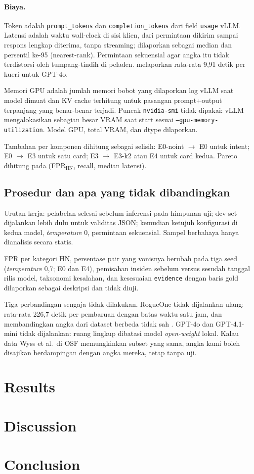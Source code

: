 \documentclass[a4paper,fleqn]{cas-dc}
\begin{document}
\paragraph{Biaya.}
Token adalah \texttt{prompt\_tokens} dan \texttt{completion\_tokens} dari
field \texttt{usage} vLLM. Latensi adalah waktu wall-clock di sisi klien,
dari permintaan dikirim sampai respons lengkap diterima, tanpa streaming;
dilaporkan sebagai median dan persentil ke-95 (nearest-rank). Permintaan
sekuensial agar angka itu tidak terdistorsi oleh tumpang-tindih di peladen.
\citet{wyss2025evaluating} melaporkan rata-rata 9,91 detik per kueri untuk
GPT-4o.

Memori GPU adalah jumlah memori bobot yang dilaporkan log vLLM saat model
dimuat dan KV cache terhitung untuk pasangan prompt+output terpanjang yang
benar-benar terjadi. Puncak \texttt{nvidia-smi} tidak dipakai: vLLM
mengalokasikan sebagian besar VRAM saat start sesuai
\texttt{--gpu-memory-utilization}. Model GPU, total VRAM, dan dtype
dilaporkan.

Tambahan per komponen dihitung sebagai selisih: E0-noint $\rightarrow$ E0
untuk intent; E0 $\rightarrow$ E3 untuk satu card; E3 $\rightarrow$ E3-k2
atau E4 untuk card kedua. Pareto dihitung pada
(FPR$_{\mathrm{HN}}$, recall, median latensi).

\subsection{Prosedur dan apa yang tidak dibandingkan}

Urutan kerja: pelabelan selesai sebelum inferensi pada himpunan uji; dev set
dijalankan lebih dulu untuk validitas JSON; kemudian ketujuh konfigurasi di
kedua model, \emph{temperature} 0, permintaan sekuensial. Sampel berbahaya
hanya dianalisis secara statis.

FPR per kategori HN, persentase pair yang vonisnya berubah pada tiga seed
(\emph{temperature} 0,7; E0 dan E4), pemisahan insiden sebelum versus sesudah
tanggal rilis model, taksonomi kesalahan, dan kesesuaian \texttt{evidence}
dengan baris gold dilaporkan sebagai deskripsi dan tidak diuji.

Tiga perbandingan sengaja tidak dilakukan. RogueOne tidak dijalankan ulang:
rata-rata 226,7 detik per pembaruan dengan batas waktu satu jam, dan
membandingkan angka dari dataset berbeda tidak sah
\citep{sofaer2024rogueone}. GPT-4o dan GPT-4.1-mini tidak dijalankan: ruang
lingkup dibatasi model \emph{open-weight} lokal. Kalau data Wyss et al.\ di OSF
memungkinkan subset yang sama, angka kami boleh disajikan berdampingan dengan
angka mereka, tetap tanpa uji.

\section{Results}\label{sec:results}

\section{Discussion}\label{sec:discussion}

\section{Conclusion}\label{sec:conclusion}

\printcredits



\end{document}
